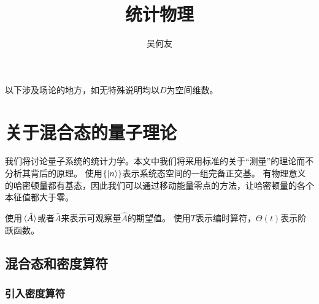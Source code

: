 \documentclass[hyperref, UTF8, a4paper]{ctexart}
\title{统计物理}
\author{吴何友}
\begin{document}
\maketitle

以下涉及场论的地方，如无特殊说明均以$D$为空间维数。

\section{关于混合态的量子理论}

我们将讨论量子系统的统计力学。本文中我们将采用标准的关于“测量”的理论而不分析其背后的原理。
使用$\{\ket{n}\}$表示系统态空间的一组完备正交基。
有物理意义的哈密顿量都有基态，因此我们可以通过移动能量零点的方法，让哈密顿量的各个本征值都大于零。

使用$\expval*{\hat{A}}$或者$\bar{A}$来表示可观察量$\hat{A}$的期望值。
使用$T$表示编时算符，$\Theta(t)$表示阶跃函数。

\subsection{混合态和密度算符}

\subsubsection{引入密度算符}\label{sec:introduction-of-density-operator}
\end{document}
